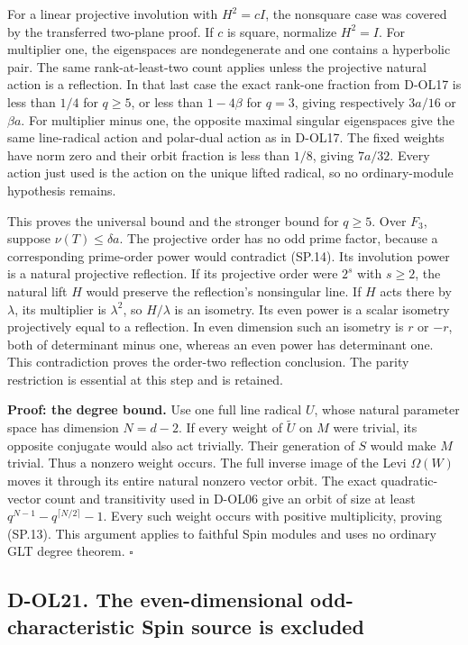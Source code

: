 For a linear projective involution with \(H^2=cI\), the nonsquare case was covered by the transferred two-plane proof. If \(c\) is square, normalize \(H^2=I\). For multiplier one, the eigenspaces are nondegenerate and one contains a hyperbolic pair. The same rank-at-least-two count applies unless the projective natural action is a reflection. In that last case the exact rank-one fraction from D-OL17 is less than \(1/4\) for \(q\ge5\), or less than \(1-4\beta\) for \(q=3\), giving respectively \(3a/16\) or \(\beta a\). For multiplier minus one, the opposite maximal singular eigenspaces give the same line-radical action and polar-dual action as in D-OL17. The fixed weights have norm zero and their orbit fraction is less than \(1/8\), giving \(7a/32\). Every action just used is the action on the unique lifted radical, so no ordinary-module hypothesis remains.

This proves the universal bound and the stronger bound for \(q\ge5\). Over \(F_3\), suppose \(\nu(T)\le\delta a\). The projective order has no odd prime factor, because a corresponding prime-order power would contradict (SP.14). Its involution power is a natural projective reflection. If its projective order were \(2^s\) with \(s\ge2\), the natural lift \(H\) would preserve the reflection's nonsingular line. If \(H\) acts there by \(\lambda\), its multiplier is \(\lambda^2\), so \(H/\lambda\) is an isometry. Its even power is a scalar isometry projectively equal to a reflection. In even dimension such an isometry is \(r\) or \(-r\), both of determinant minus one, whereas an even power has determinant one. This contradiction proves the order-two reflection conclusion. The parity restriction is essential at this step and is retained.

\textbf{Proof: the degree bound.} Use one full line radical \(U\), whose natural parameter space has dimension \(N=d-2\). If every weight of \(\widetilde U\) on \(M\) were trivial, its opposite conjugate would also act trivially. Their generation of \(S\) would make \(M\) trivial. Thus a nonzero weight occurs. The full inverse image of the Levi \(\Omega(W)\) moves it through its entire natural nonzero vector orbit. The exact quadratic-vector count and transitivity used in D-OL06 give an orbit of size at least \(q^{N-1}-q^{\lceil N/2\rceil}-1\). Every such weight occurs with positive multiplicity, proving (SP.13). This argument applies to faithful Spin modules and uses no ordinary GLT degree theorem. \(\square\)

\subsection{D-OL21. The even-dimensional odd-characteristic Spin source is excluded}\label{d-ol21.-the-even-dimensional-odd-characteristic-spin-source-is-excluded}

